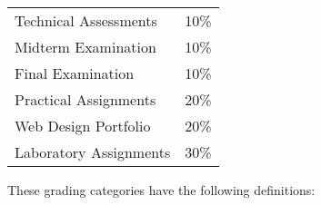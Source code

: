 \documentclass[11pt]{article}
\begin{document}
\begin{center}

  \begin{tabular}{ll}
    Technical Assessments      & 10\% \\
    Midterm Examination        & 10\% \\
    Final Examination          & 10\% \\
    Practical Assignments      & 20\% \\
    Web Design Portfolio       & 20\% \\
    Laboratory Assignments     & 30\%
  \end{tabular}

\end{center}


\noindent
These grading categories have the following definitions:

\end{document}
